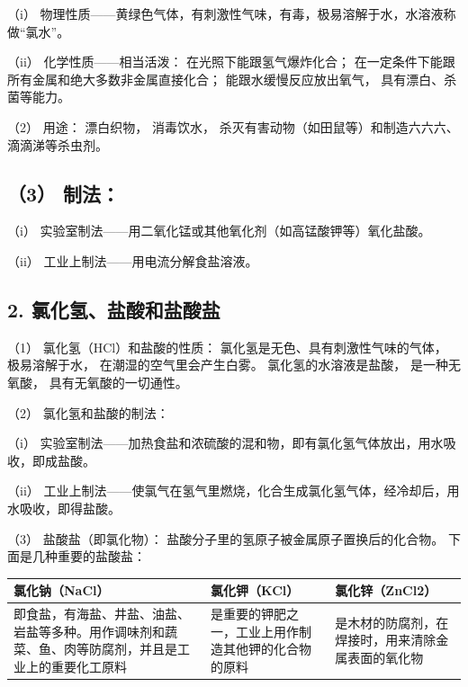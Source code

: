 （i）
物理性质------黄绿色气体，有刺激性气味，有毒，极易溶解于水，水溶液称做``氯水''。

（ii） 化学性质------相当活泼： 在光照下能跟氢气爆炸化合；
在一定条件下能跟所有金属和绝大多数非金属直接化合；
能跟水缓慢反应放出氧气， 具有漂白、杀菌等能力。

（2） 用途： 漂白织物， 消毒饮水，
杀灭有害动物（如田鼠等）和制造六六六、滴滴涕等杀虫剂。

\subsection{（3） 制法：}

（i） 实验室制法------用二氧化锰或其他氧化剂（如高锰酸钾等）氧化盐酸。

（ii） 工业上制法------用电流分解食盐溶液。

\subsection{2. 氯化氢、盐酸和盐酸盐}

（1） 氯化氢（HCl）和盐酸的性质： 氯化氢是无色、具有刺激性气味的气体，
极易溶解于水， 在潮湿的空气里会产生白雾。 氯化氢的水溶液是盐酸，
是一种无氧酸， 具有无氧酸的一切通性。

（2） 氯化氢和盐酸的制法：

（i）
实验室制法------加热食盐和浓硫酸的混和物，即有氯化氢气体放出，用水吸收，即成盐酸。

（ii）
工业上制法------使氯气在氢气里燃烧，化合生成氯化氢气体，经冷却后，用水吸收，即得盐酸。

（3） 盐酸盐（即氯化物）： 盐酸分子里的氢原子被金属原子置换后的化合物。
下面是几种重要的盐酸盐：

{\def\LTcaptype{none} %
\begin{longtable}[]{@{}
  >{\raggedright\arraybackslash}p{}
  >{\raggedright\arraybackslash}p{}
  >{\raggedright\arraybackslash}p{}@{}}
\toprule\noalign{}
\begin{minipage}[b]{\linewidth}\raggedright
氯化钠（NaCl）
\end{minipage} & \begin{minipage}[b]{\linewidth}\raggedright
氯化钾（KCl）
\end{minipage} & \begin{minipage}[b]{\linewidth}\raggedright
氯化锌（ZnCl2）
\end{minipage} \\
\midrule\noalign{}
\endhead
\bottomrule\noalign{}
\endlastfoot
即食盐，有海盐、井盐、油盐、岩盐等多种。用作调味剂和蔬菜、鱼、肉等防腐剂，并且是工业上的重要化工原料
& 是重要的钾肥之一，工业上用作制造其他钾的化合物的原料 &
是木材的防腐剂，在焊接时，用来清除金属表面的氧化物 \\
\end{longtable}
}

